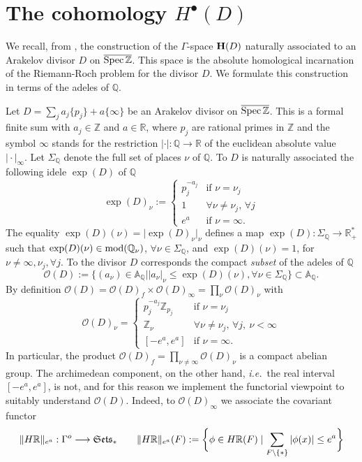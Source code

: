 \documentclass[cupthm]{CUP-JNL-JMJ}
\numberwithin{equation}{section}
\theoremstyle{cupplain}
\theoremstyle{cupdefinition}
\theoremstyle{cupremark}
\theoremstyle{cupproof}
\def\A{{\mathbb A}}
\def\Q{{\mathbb Q}}
\def\R{{\mathbb R}}
\def\Z{{\mathbb Z}}
\def\cO{{\mathcal O}}
\def\bfh{{\bf H}}
\def\Spec{{\rm Spec\,}}
\def\Se{\frak{ Sets}}
\def\spzb{{\overline{\Spec\Z}}}
\newcommand{\ie}{{\it i.e.\/}\ }
\begin{document}
\section{The  cohomology $H^\bullet(D)$}\label{sec2}

We recall, from \cite{CCAtiyah}, the construction of the $\Gamma$-space $\bfh(D)$   naturally associated to an Arakelov divisor $D$ on $\spzb$. This space  is the  absolute homological incarnation of the Riemann-Roch problem for the divisor $D$. We formulate this construction  in terms of the adeles of $\Q$.

Let $D=\sum_j a_j\{p_j\} + a\{\infty\}$ be an Arakelov divisor on $\spzb$. This is a formal finite sum with $a_j\in\Z$ and $a\in\R$, where $p_j$ are rational primes in $\Z$ and the symbol $\infty$ stands for the restriction $\vert\cdot\vert: \Q\stackrel{}{\to} \R$ of the  euclidean absolute value $\vert\cdot\vert_\infty$. Let  $\Sigma_\Q$ denote the full set of places $\nu$ of $\Q$.   To  $D$ is naturally associated the following idele $\exp(D)$ of $\Q$ 
\[
\exp(D)_\nu:=\begin{cases}p_j^{-a_j}& \text{if $\nu=\nu_j$}\\
1& \forall \nu\neq \nu_j,\, \forall j\\
e^a& \text{if $\nu=\infty$}.	
\end{cases}
\] 
The equality $\exp(D)(\nu)=\vert \exp(D)_\nu\vert_\nu$ 
 defines a map $\exp(D):\Sigma_\Q\to \R_+^*$ such that $\exp(D)(\nu)\in  {\rm mod}(\Q_\nu)$, $\forall \nu \in \Sigma_\Q$, and $\exp(D)(\nu)=1$,  for   $ \nu\neq \infty,  \nu_j, \forall j$.  To the divisor $D$ corresponds the compact \emph{subset}  of the adeles of $\Q$
\[
\cO(D):=\big\{(a_\nu)\in\A_\Q\mid\vert a_\nu\vert_\nu\le \exp(D)(\nu), \forall \nu\in\Sigma_\Q\big\}\subset \A_\Q.
\]
By definition  $\cO(D)=\cO(D)_f \times \cO(D)_\infty=\prod_\nu \cO(D)_\nu$ with
\[
\cO(D)_\nu=\begin{cases}p_j^{-a_j}\Z_{p_j}& \text{if $\nu=\nu_j$}\\
\Z_\nu & \forall \nu\neq \nu_j,\, \forall j,~ \nu<\infty\\
[-e^a, e^a]& \text{if $\nu=\infty$}.
\end{cases}
\]
In particular, the product $\cO(D)_f=\prod_{\nu\neq \infty} \cO(D)_\nu$ is a compact abelian group. The archimedean component, on the other hand, \ie the real interval $[-e^a, e^a]$, is not, and for this reason we implement the functorial viewpoint to suitably understand $\cO(D)$.  Indeed, to $\cO(D)_\infty$  we associate the  covariant functor 
\[
\| H\R\|_{e^a}: \Gamma^{o}\longrightarrow \Se_*\qquad \| H\R\|_{e^a}(F):=\bigg\{\phi\in H\R(F)\mid \sum_{F\setminus \{*\}} \vert\phi(x)\vert\leq e^a\bigg\}
\]
\end{document}
